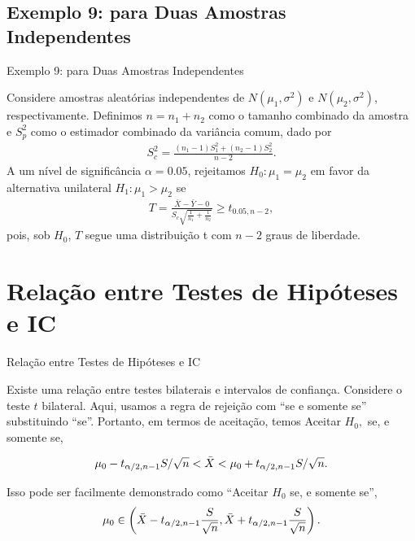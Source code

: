 \documentclass[12pt]{beamer}
\begin{document}
\subsection{Exemplo 9: para Duas Amostras Independentes}
\begin{frame}{Exemplo 9: para Duas Amostras Independentes}
	\vspace{-0.2cm}
	\begin{block}{}
		\justifying
		Considere amostras aleatórias independentes de $N(\mu_1, \sigma^2)$ e $N(\mu_2, \sigma^2)$, respectivamente. Definimos $n = n_1 + n_2$ como o tamanho combinado da amostra e $S_{p}^2$ como o estimador combinado da variância comum, dado por
		\begin{align*}
			S_{c}^2 = \frac{(n_1 - 1)S_1^2 + (n_2 - 1)S_2^2}{n - 2}.
		\end{align*}
		A um nível de significância $\alpha = 0.05$, rejeitamos $H_0 : \mu_1 = \mu_2$ em favor da alternativa unilateral $H_1 : \mu_1 > \mu_2$ se
		\begin{align*}
			T = \frac{\bar{X} - \bar{Y} - 0}{S_c\sqrt{\frac{1}{n_1} + \frac{1}{n_2}}}  \geq t_{0.05, n-2},
		\end{align*}
		pois, sob $H_0$, $T$ segue uma distribuição t com $n - 2$ graus de liberdade.
	\end{block}
\end{frame}

\section{Relação entre Testes de Hipóteses e IC}
\begin{frame}{Relação entre Testes de Hipóteses e IC}
\begin{block}{}
\justifying
Existe uma relação entre testes bilaterais e intervalos de confiança. Considere o teste $t$ bilateral. Aqui, usamos a regra de rejeição com ``se e somente se'' substituindo ``se''. Portanto, em termos de aceitação, temos Aceitar $H_0,$ se, e somente se,

\begin{align*}
\mu_0 - t_{\alpha/2, n-1}S/\sqrt{n} < \Bar{X} < \mu_0 + t_{\alpha/2, n-1}S/\sqrt{n}.
\end{align*}
\end{block}
\pause
\begin{block}{}
Isso pode ser facilmente demonstrado como ``Aceitar $H_0$ se, e somente se'',
\begin{align*}
\mu_0 \in \left(\Bar{X} - t_{\alpha/2, n-1}\frac{S}{\sqrt{n}}, \Bar{X} + t_{\alpha/2, n-1}\frac{S}{\sqrt{n}}\right).
\end{align*}
\end{block}
\end{frame}
\end{document}
